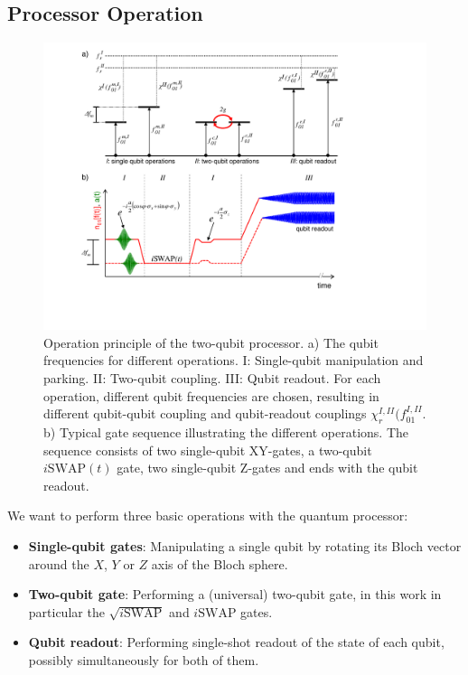 \subsection{Processor Operation}

\begin{figure}[ht!]
	\centering
	\includegraphics[width=\textwidth]{./material/figures/2-qubit-processor/processor_working_principle}
	\caption[...]{Operation principle of the two-qubit processor. a) The qubit frequencies for different operations. I: Single-qubit manipulation and parking. II: Two-qubit coupling. III: Qubit readout. For each operation, different qubit frequencies are chosen, resulting in different qubit-qubit coupling and qubit-readout couplings $\chi_r^{I,II}(f_{01}^{I,II}$. b) Typical gate sequence illustrating the different operations. The sequence consists of two single-qubit XY-gates, a two-qubit $i\mathrm{SWAP}(t)$ gate, two single-qubit Z-gates and ends with the qubit readout.}
	\label{fig:processor_operation}
\end{figure}

We want to perform three basic operations with the quantum processor:

\begin{itemize}
\item \textbf{Single-qubit gates}: Manipulating a single qubit by rotating its Bloch vector around the $X$, $Y$ or $Z$ axis of the Bloch sphere.
\item \textbf{Two-qubit gate}: Performing a (universal) two-qubit gate, in this work in particular the $\sqrt{i\mathrm{SWAP}}$ and $i\mathrm{SWAP}$ gates.
\item \textbf{Qubit readout}: Performing single-shot readout of the state of each qubit, possibly simultaneously for both of them.
\end{itemize}

